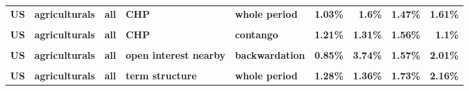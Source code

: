 \documentclass[
  authoryear,
  preprint,
  3p]{elsarticle}
\begin{document}
\begin{landscape}
\begin{longtable}[t]{>{}l>{}l>{}l>{}l>{}l>{}r>{}r>{}r>{}r}
\textbf{US} & \textbf{agriculturals} & \textbf{all} & \textbf{CHP} & \textbf{whole period} & \textcolor[HTML]{4285f4}{\textbf{1.03\%}} & \textcolor[HTML]{4285f4}{\textbf{1.6\%}} & \textcolor[HTML]{4285f4}{\textbf{1.47\%}} & \textcolor[HTML]{4285f4}{\textbf{1.61\%}}\\
\textbf{\cellcolor{gray!10}{US}} & \textbf{\cellcolor{gray!10}{agriculturals}} & \textbf{\cellcolor{gray!10}{all}} & \textbf{\cellcolor{gray!10}{CHP}} & \textbf{\cellcolor{gray!10}{backwardation}} & \textcolor[HTML]{4285f4}{\textbf{\cellcolor{gray!10}{1.14\%}}} & \textcolor[HTML]{4285f4}{\textbf{\cellcolor{gray!10}{2.47\%}}} & \textcolor[HTML]{4285f4}{\textbf{\cellcolor{gray!10}{1.72\%}}} & \textcolor[HTML]{4285f4}{\textbf{\cellcolor{gray!10}{3.11\%}}}\\
\textbf{US} & \textbf{agriculturals} & \textbf{all} & \textbf{CHP} & \textbf{contango} & \textcolor[HTML]{4285f4}{\textbf{1.21\%}} & \textcolor[HTML]{4285f4}{\textbf{1.31\%}} & \textcolor[HTML]{4285f4}{\textbf{1.56\%}} & \textcolor[HTML]{4285f4}{\textbf{1.1\%}}\\
\addlinespace
\textbf{\cellcolor{gray!10}{US}} & \textbf{\cellcolor{gray!10}{agriculturals}} & \textbf{\cellcolor{gray!10}{all}} & \textbf{\cellcolor{gray!10}{open interest nearby}} & \textbf{\cellcolor{gray!10}{whole period}} & \textcolor[HTML]{4285f4}{\textbf{\cellcolor{gray!10}{1.09\%}}} & \textcolor[HTML]{4285f4}{\textbf{\cellcolor{gray!10}{1.9\%}}} & \textcolor[HTML]{4285f4}{\textbf{\cellcolor{gray!10}{0.45\%}}} & \textcolor[HTML]{4285f4}{\textbf{\cellcolor{gray!10}{1\%}}}\\
\textbf{US} & \textbf{agriculturals} & \textbf{all} & \textbf{open interest nearby} & \textbf{backwardation} & \textcolor[HTML]{4285f4}{\textbf{0.85\%}} & \textcolor[HTML]{4285f4}{\textbf{3.74\%}} & \textcolor[HTML]{4285f4}{\textbf{1.57\%}} & \textcolor[HTML]{4285f4}{\textbf{2.01\%}}\\
\textbf{\cellcolor{gray!10}{US}} & \textbf{\cellcolor{gray!10}{agriculturals}} & \textbf{\cellcolor{gray!10}{all}} & \textbf{\cellcolor{gray!10}{open interest nearby}} & \textbf{\cellcolor{gray!10}{contango}} & \textcolor[HTML]{4285f4}{\textbf{\cellcolor{gray!10}{1.58\%}}} & \textcolor[HTML]{4285f4}{\textbf{\cellcolor{gray!10}{0.97\%}}} & \textcolor[HTML]{4285f4}{\textbf{\cellcolor{gray!10}{0.58\%}}} & \textcolor[HTML]{4285f4}{\textbf{\cellcolor{gray!10}{0.67\%}}}\\
\textbf{US} & \textbf{agriculturals} & \textbf{all} & \textbf{term structure} & \textbf{whole period} & \textcolor[HTML]{4285f4}{\textbf{1.28\%}} & \textcolor[HTML]{4285f4}{\textbf{1.36\%}} & \textcolor[HTML]{4285f4}{\textbf{1.73\%}} & \textcolor[HTML]{4285f4}{\textbf{2.16\%}}\\

\end{longtable}
\end{landscape}
\end{document}
